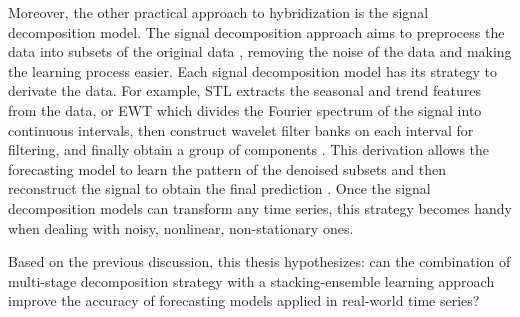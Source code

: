 Moreover, the other practical approach to hybridization is the signal decomposition model. The signal decomposition approach aims to preprocess the data into subsets of the original data \cite{zhou2022Empirical}, removing the noise of the data and making the learning process easier. Each signal decomposition model has its strategy to derivate the data. For example, \ac{STL} extracts the seasonal and trend features from the data, or \ac{EWT} which divides the Fourier spectrum of the signal into continuous intervals, then construct wavelet filter banks on each interval for filtering, and finally obtain a group of components \cite{fan2023Shortterm}. This derivation allows the forecasting model to learn the pattern of the denoised subsets and then reconstruct the signal to obtain the final prediction \cite{moreno2018Wind}. Once the signal decomposition models can transform any time series, this strategy becomes handy when dealing with noisy, nonlinear, non-stationary ones.

Based on the previous discussion, this thesis hypothesizes: can the combination of multi-stage decomposition strategy with a stacking-ensemble learning approach improve the accuracy of forecasting models applied in real-world time series?
